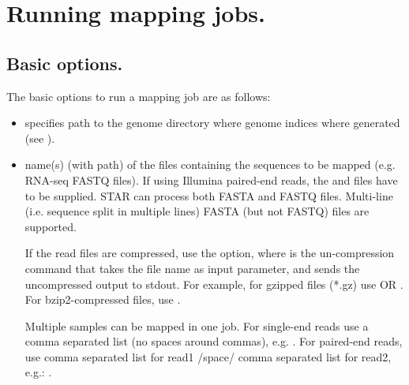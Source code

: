 \documentclass[12pt]{article}
\begin{document}
\section{Running mapping jobs.}\label{Running_mapping_jobs}
\subsection{Basic options.}
The basic options to run a mapping job are as follows:

\begin{itemize}
\item[]

 specifies path to the genome directory where genome indices where generated (see ).

\item[]
 name(s) (with path) of the files containing the sequences to be mapped (e.g. RNA-seq FASTQ files). If using Illumina paired-end reads, the  and  files have to be supplied. STAR can process both FASTA and FASTQ files. Multi-line (i.e. sequence split in multiple lines) FASTA (but not FASTQ) files are supported. 

If the read files are compressed, use the   option, where  is the un-compression command that takes the file name as input parameter, and sends the uncompressed output to stdout. For example, for gzipped files (*.gz) use
OR
.
For bzip2-compressed files, use
.

Multiple samples can be mapped in one job. For single-end reads use a comma separated list (no spaces around commas), e.g.
 . For paired-end reads, use comma separated list for read1 /space/ comma separated list for read2, e.g.:  .

\end{itemize}
\end{document}
